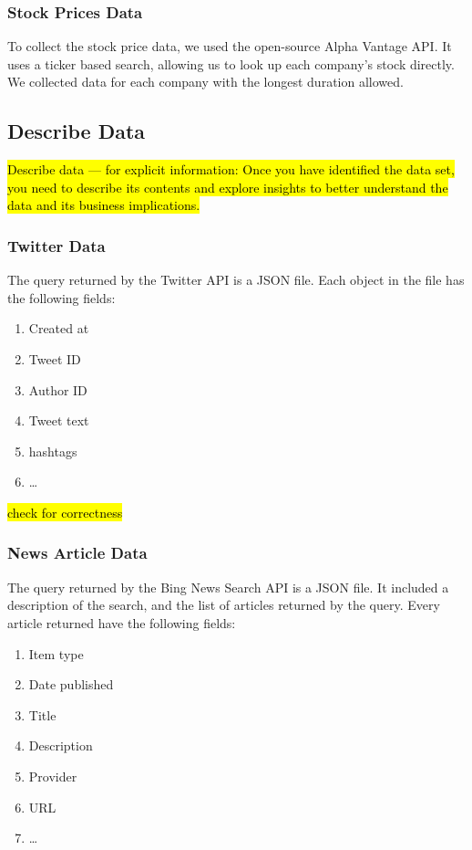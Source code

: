 \documentclass[sigconf, nonacm]{acmart}
\begin{document}
\subsubsection{Stock Prices Data}
To collect the stock price data, we used the open-source Alpha Vantage API. It uses a ticker based search, allowing us to look up each company's stock directly. We collected data for each company with the longest duration allowed.
\subsection{Describe Data} %
\hl{Describe data — for explicit information: Once you have identified the data set, you need to describe its contents and explore insights to better understand the data and its business implications.}

\subsubsection{Twitter Data}
The query returned by the Twitter API is a JSON file. Each object in the file has the following fields:

\begin{enumerate}
    \item Created at
    \item Tweet ID
    \item Author ID
    \item Tweet text
    \item hashtags
    \item \dots
\end{enumerate}

\hl{check for correctness}


\subsubsection{News Article Data}
The query returned by the Bing News Search API is a JSON file. It included a description of the search, and the list of articles returned by the query. Every article returned have the following fields:

\begin{enumerate}
    \item Item type
    \item Date published
    \item Title
    \item Description
    \item Provider
    \item URL
    \item \dots
\end{enumerate}
\end{document}
